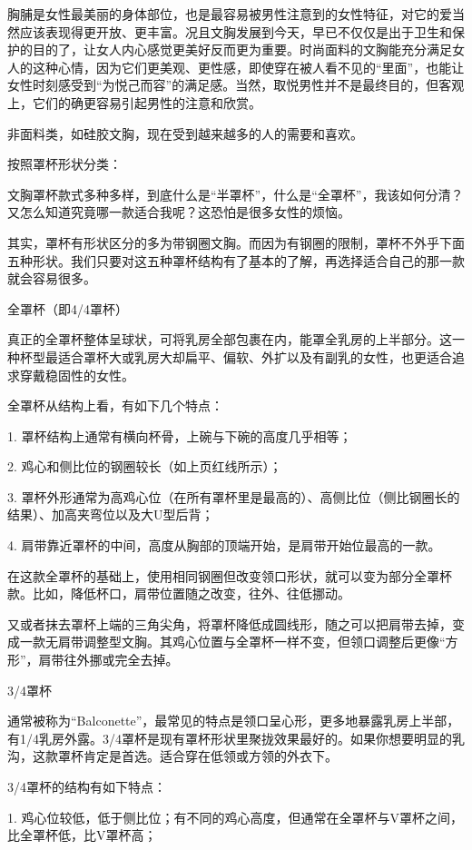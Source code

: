 \documentclass[12pt,UTF8]{ctexbook}
\begin{document}
胸脯是女性最美丽的身体部位，也是最容易被男性注意到的女性特征，对它的爱当然应该表现得更开放、更丰富。况且文胸发展到今天，早已不仅仅是出于卫生和保护的目的了，让女人内心感觉更美好反而更为重要。时尚面料的文胸能充分满足女人的这种心情，因为它们更美观、更性感，即使穿在被人看不见的“里面”，也能让女性时刻感受到“为悦己而容”的满足感。当然，取悦男性并不是最终目的，但客观上，它们的确更容易引起男性的注意和欣赏。

非面料类，如硅胶文胸，现在受到越来越多的人的需要和喜欢。

按照罩杯形状分类：

文胸罩杯款式多种多样，到底什么是“半罩杯”，什么是“全罩杯”，我该如何分清？又怎么知道究竟哪一款适合我呢？这恐怕是很多女性的烦恼。

其实，罩杯有形状区分的多为带钢圈文胸。而因为有钢圈的限制，罩杯不外乎下面五种形状。我们只要对这五种罩杯结构有了基本的了解，再选择适合自己的那一款就会容易很多。

全罩杯（即4/4罩杯）

真正的全罩杯整体呈球状，可将乳房全部包裹在内，能罩全乳房的上半部分。这一种杯型最适合罩杯大或乳房大却扁平、偏软、外扩以及有副乳的女性，也更适合追求穿戴稳固性的女性。

全罩杯从结构上看，有如下几个特点：

1. 罩杯结构上通常有横向杯骨，上碗与下碗的高度几乎相等；

2. 鸡心和侧比位的钢圈较长（如上页红线所示）；

3. 罩杯外形通常为高鸡心位（在所有罩杯里是最高的）、高侧比位（侧比钢圈长的结果）、加高夹弯位以及大U型后背；

4. 肩带靠近罩杯的中间，高度从胸部的顶端开始，是肩带开始位最高的一款。

在这款全罩杯的基础上，使用相同钢圈但改变领口形状，就可以变为部分全罩杯款。比如，降低杯口，肩带位置随之改变，往外、往低挪动。



又或者抹去罩杯上端的三角尖角，将罩杯降低成圆线形，随之可以把肩带去掉，变成一款无肩带调整型文胸。其鸡心位置与全罩杯一样不变，但领口调整后更像“方形”，肩带往外挪或完全去掉。



3/4罩杯

通常被称为“Balconette”，最常见的特点是领口呈心形，更多地暴露乳房上半部，有1/4乳房外露。3/4罩杯是现有罩杯形状里聚拢效果最好的。如果你想要明显的乳沟，这款罩杯肯定是首选。适合穿在低领或方领的外衣下。


3/4罩杯的结构有如下特点：

1. 鸡心位较低，低于侧比位；有不同的鸡心高度，但通常在全罩杯与V罩杯之间，比全罩杯低，比V罩杯高；
\end{document}
